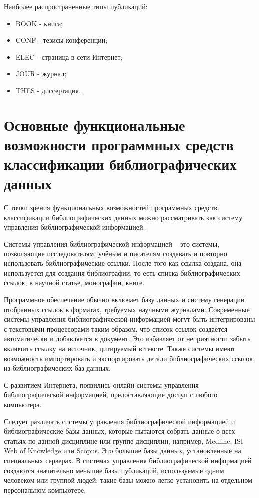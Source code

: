 Наиболее распространенные типы публикаций:

\begin{itemize}
	\item BOOK - книга;
	\item CONF - тезисы конференции;
	\item ELEC - страница в сети Интернет;
	\item JOUR - журнал;
	\item THES - диссертация.
\end{itemize}

\section{Основные функциональные возможности программных средств классификации библиографических данных}

С точки зрения функциональных возможностей программных средств классификации библиографических данных можно рассматривать как систему управления библиографической информацией.

Системы управления библиографической информацией -- это системы, позволяющие исследователям, учёным и писателям создавать и повторно использовать библиографические ссылки. После того как ссылка создана, она используется для создания библиографии, то есть списка библиографических ссылок, в научной статье, монографии, книге.

Программное обеспечение обычно включает базу данных и систему генерации отобранных ссылок в форматах, требуемых научными журналами. Современные системы управления библиографической информацией могут быть интегрированы с текстовыми процессорами таким образом, что список ссылок создаётся автоматически и добавляется в документ. Это избавляет от неприятности забыть включить ссылку на источник, цитируемый в тексте. Также системы имеют возможность импортировать и экспортировать детали библиографических ссылок из библиографических баз данных.

С развитием Интернета, появились онлайн-системы управления библиографической информацией, предоставляющие доступ с любого компьютера.

Следует различать системы управления библиографической информацией и библиографические базы данных, которые пытаются собрать данные о всех статьях по данной дисциплине или группе дисциплин, например, Medline, ISI Web of Knowledge или Scopus. Это большие базы данных, установленные на специальных серверах. В системах управления библиографической информацией создаются значительно меньшие базы публикаций, используемые одним человеком или группой людей; такие базы можно легко установить на отдельном персональном компьютере.

